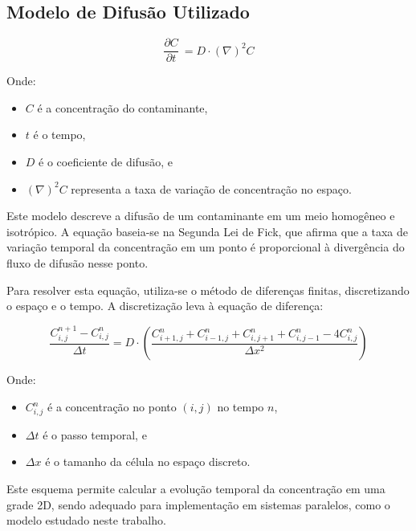 \subsection{Modelo de Difusão Utilizado} \label{sec:firstpage}

\[\frac{\partial C}{\partial t}\ = D \cdot (\nabla)^{2} C \]

Onde:
\begin{itemize}
    \item \( C \) é a concentração do contaminante,
    \item \( t \) é o tempo,
    \item \( D \) é o coeficiente de difusão, e
    \item \( (\nabla)^{2} C \) representa a taxa de variação de concentração no espaço.
\end{itemize}

Este modelo descreve a difusão de um contaminante em um meio homogêneo e isotrópico. A equação baseia-se na Segunda Lei de Fick, que afirma que a taxa de variação temporal da concentração em um ponto é proporcional à divergência do fluxo de difusão nesse ponto.

Para resolver esta equação, utiliza-se o método de diferenças finitas, discretizando o espaço e o tempo. A discretização leva à equação de diferença:

\[
    \frac{C^{n+1}_{i,j} - C^{n}_{i,j}}{\Delta t} = D \cdot \left( \frac{C^{n}_{i+1,j} + C^{n}_{i-1,j} + C^{n}_{i,j+1} + C^{n}_{i,j-1} - 4C^{n}_{i,j}}{\Delta x^2} \right)
\]

Onde:
\begin{itemize}
    \item \( C^{n}_{i,j} \) é a concentração no ponto \( (i,j) \) no tempo \( n \),
    \item \( \Delta t \) é o passo temporal, e
    \item \( \Delta x \) é o tamanho da célula no espaço discreto.
\end{itemize}

Este esquema permite calcular a evolução temporal da concentração em uma grade 2D, sendo adequado para implementação em sistemas paralelos, como o modelo estudado neste trabalho.